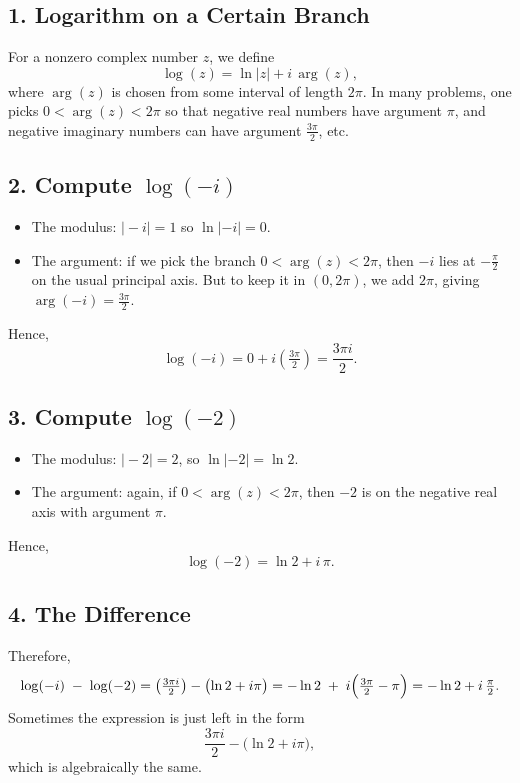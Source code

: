 \documentclass[12pt]{article}
\theoremstyle{definition} %
\theoremstyle{plain} %
\begin{document}
\subsection*{1. Logarithm on a Certain Branch}

For a nonzero complex number $z$, we define
\[
\log(z) = \ln|z| + i\,\arg(z),
\]
where $\arg(z)$ is chosen from some interval of length $2\pi$. In many problems, one picks $0 < \arg(z) < 2\pi$ so that negative real numbers have argument $\pi$, and negative imaginary numbers can have argument $\tfrac{3\pi}{2}$, etc.

\subsection*{2. Compute \(\log(-i)\)}

\begin{itemize}
  \item The modulus: $\bigl|-i\bigr|=1$ so $\ln|-i|=0$.
  \item The argument: if we pick the branch $0 < \arg(z) < 2\pi$, then $-i$ lies at $-\frac{\pi}{2}$ on the usual principal axis. But to keep it in $(0,2\pi)$, we add $2\pi$, giving $\arg(-i) = \frac{3\pi}{2}$.
\end{itemize}
Hence,
\[
\log(-i) 
= 0 + i\left(\tfrac{3\pi}{2}\right)
= \frac{3\pi i}{2}.
\]

\subsection*{3. Compute \(\log(-2)\)}

\begin{itemize}
  \item The modulus: $\bigl|-2\bigr|=2$, so $\ln|-2| = \ln 2$.
  \item The argument: again, if $0<\arg(z)<2\pi$, then $-2$ is on the negative real axis with argument $\pi$. 
\end{itemize}
Hence,
\[
\log(-2)
= \ln 2 + i\,\pi.
\]

\subsection*{4. The Difference}

Therefore,
\[
\log(-i) \;-\; \log(-2)
= \bigl(\tfrac{3\pi i}{2}\bigr) - \bigl(\ln 2 + i\pi\bigr)
= -\ln 2 \;+\; i\Bigl(\tfrac{3\pi}{2} - \pi\Bigr)
= -\ln 2 + i\,\tfrac{\pi}{2}.
\]
Sometimes the expression is just left in the form
\[
\frac{3\pi i}{2} - \bigl(\ln 2 + i\pi\bigr),
\]
which is algebraically the same.
\end{document}

